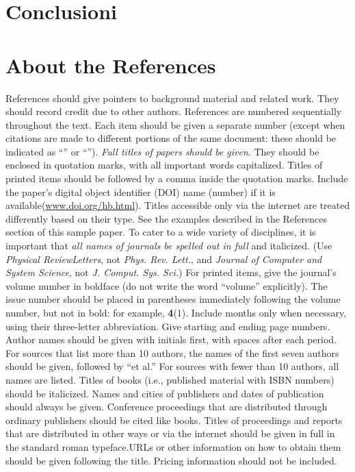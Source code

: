 \documentclass{article}
\begin{document}
\section{Conclusioni}
\section{About the References}
References should give pointers to background material and related work. They should record credit due to other authors. 
References are numbered sequentially throughout the text. 
Each item should be given a separate number (except when citations are made to different portions of the same document: these should be indicated as {``}\cite[pp. 3--56]{text-a}{''} or {``}\cite[Chapter 14]{text-b}{''}). 
\textit{Full titles of papers should be given}. They should be enclosed in quotation marks, with all important words capitalized. Titles of printed items should be followed by a comma inside the quotation marks. Include the paper{'}s digital object identifier (DOI) name (number) if it is available(\url{www.doi.org/hb.html}). Titles accessible only via the internet are treated differently based on their type. See the examples described in the References section of this sample paper.
To cater to a wide variety of disciplines, it is important that \textit{all names of journals be spelled out in full} and italicized. (Use \textit{Physical ReviewLetters}, not\textit{ Phys. Rev. Lett.}, and \textit{Journal of Computer and System Science}, not \textit{J. Comput. Sys. Sci.}) 
For printed items, give the journal{'}s volume number in boldface (do not write the word {``}volume{''} explicitly). The issue number should be placed in parentheses immediately following the volume number, but not in bold: for example, \textbf{4}(1). Include months only when necessary, using their three-letter abbreviation. Give starting and ending page numbers.
Author names should be given with initials first, with spaces after each period. For sources that list more than 10 authors, the names of the first seven authors should be given, followed by {``}et al.{''} For sources with fewer than 10 authors, all names are listed.
Titles of books (i.e., published material with ISBN numbers) should be italicized. Names and cities of publishers and dates of publication should always be given. Conference proceedings that are distributed through ordinary publishers should be cited like books. 
Titles of proceedings and reports that are distributed in other ways or via the internet should be given in full in the standard roman typeface.URLs or other information on how to obtain them should be given following the title. Pricing information should not be included.
\end{document}
